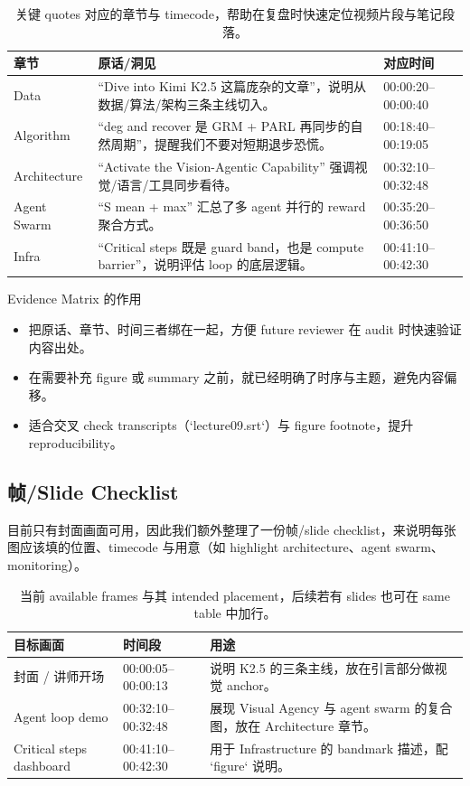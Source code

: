 \documentclass[a4paper]{article}
\begin{document}
\begin{table}[H]
\footnotesize
\centering
\begin{tabular}{p{3cm}p{4cm}p{5cm}}
\toprule
章节 & 原话/洞见 & 对应时间 \\
\midrule
Data & ``Dive into Kimi K2.5 这篇庞杂的文章''，说明从数据/算法/架构三条主线切入。 & 00:00:20--00:00:40 \\
Algorithm & ``deg and recover 是 GRM + PARL 再同步的自然周期''，提醒我们不要对短期退步恐慌。 & 00:18:40--00:19:05 \\
Architecture & ``Activate the Vision-Agentic Capability'' 强调视觉/语言/工具同步看待。 & 00:32:10--00:32:48 \\
Agent Swarm & ``S mean + max'' 汇总了多 agent 并行的 reward 聚合方式。 & 00:35:20--00:36:50 \\
Infra & ``Critical steps 既是 guard band，也是 compute barrier''，说明评估 loop 的底层逻辑。 & 00:41:10--00:42:30 \\
\bottomrule
\end{tabular}
\caption{关键 quotes 对应的章节与 timecode，帮助在复盘时快速定位视频片段与笔记段落。}
\end{table}

\begin{knowledgebox}{Evidence Matrix 的作用}
\begin{itemize}
    \item 把原话、章节、时间三者绑在一起，方便 future reviewer 在 audit 时快速验证内容出处。
    \item 在需要补充 figure 或 summary 之前，就已经明确了时序与主题，避免内容偏移。
    \item 适合交叉 check transcripts（`lecture09.srt`）与 figure footnote，提升 reproducibility。
\end{itemize}
\end{knowledgebox}

\subsection{帧/Slide Checklist}
目前只有封面画面可用，因此我们额外整理了一份帧/slide checklist，来说明每张图应该填的位置、timecode 与用意（如 highlight architecture、agent swarm、monitoring）。

\begin{table}[H]
\footnotesize
\centering
\begin{tabular}{p{3cm}p{4cm}p{5cm}}
\toprule
目标画面 & 时间段 & 用途 \\
\midrule
封面 / 讲师开场 & 00:00:05--00:00:13 & 说明 K2.5 的三条主线，放在引言部分做视觉 anchor。 \\
Agent loop demo & 00:32:10--00:32:48 & 展现 Visual Agency 与 agent swarm 的复合图，放在 Architecture 章节。 \\
Critical steps dashboard & 00:41:10--00:42:30 & 用于 Infrastructure 的 bandmark 描述，配 `figure` 说明。 \\
\bottomrule
\end{tabular}
\caption{当前 available frames 与其 intended placement，后续若有 slides 也可在 same table 中加行。}
\end{table}
\end{document}
